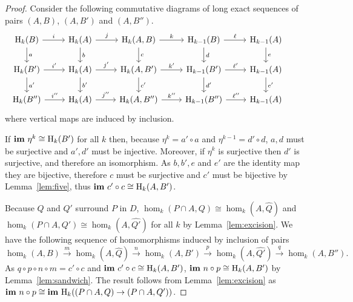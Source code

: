 \begin{proof}
  Consider the following commutative diagrams of long exact sequences of pairs $(A, B)$, $(A, B')$ and $(A, B'')$.
  \begin{equation}\begin{tikzcd}
    \hom_k(B)\arrow{r}{i}\arrow{d}{a} &
    \hom_k(A)\arrow{r}{j}\arrow{d}{b} &
    \hom_k(A, B)\arrow{r}{k}\arrow{d}{c} &
    \hom_{k-1}(B)\arrow{r}{\ell}\arrow{d}{d} &
    \hom_{k-1}(A)\arrow{d}{e} &\\
    \hom_k(B')\arrow{r}{i'}\arrow{d}{a'} &
    \hom_k(A)\arrow{r}{j'}\arrow{d}{b'} &
    \hom_k(A, B')\arrow{r}{k'}\arrow{d}{c'} &
    \hom_{k-1}(B')\arrow{r}{\ell'}\arrow{d}{d'} &
    \hom_{k-1}(A)\arrow{d}{e'} \\
    \hom_k(B'')\arrow{r}{i''}&
    \hom_k(A)\arrow{r}{j''}&
    \hom_k(A, B'')\arrow{r}{k''}&
    \hom_{k-1}(B'')\arrow{r}{\ell''} &
    \hom_{k-1}(A)
  \end{tikzcd}\end{equation}
  where vertical maps are induced by inclusion.

  If $\mathbf{im}~\eta^k\cong\mathrm{H}_k(B')$ for all $k$ then, because $\eta^k = a'\circ a$ and $\eta^{k-1} = d'\circ d$, $a, d$ must be surjective and $a', d'$ must be injective.
  Moreover, if $\eta^k$ is surjective then $d'$ is surjective, and therefore an isomorphism.
  As $b,b',e$ and $e'$ are the identity map they are bijective, therefore $c$ must be surjective and $c'$ must be bijective by Lemma~\ref{lem:five}, thus $\mathbf{im}~c'\circ c\cong \mathrm{H}_k(A, B')$.

  Because $Q$ and $Q'$ surround $P$ in $D$, $\hom_k(P\cap A, Q)\cong \hom_k(A, \hat{Q})$ and $\hom_k(P\cap A, Q')\cong \hom_k(A, \hat{Q'})$ for all $k$ by Lemma~\ref{lem:excision}.
  We have the following sequence of homomorphisms induced by inclusion of pairs
  \[ \hom_k(A, B)\xrightarrow{m}\hom_k(A, \hat{Q})\xrightarrow{n}\hom_k(A, B')\xrightarrow{p}\hom_k(A, \hat{Q'})\xrightarrow{q}\hom_k(A, B'').\]
  As $q\circ p\circ n\circ m = c' \circ c$ and $\mathbf{im}~c'\circ c\cong \mathrm{H}_k(A, B')$, $\mathbf{im}~n\circ p\cong \mathrm{H}_k(A, B')$ by Lemma~\ref{lem:sandwich}.
  The result follows from Lemma~\ref{lem:excision} as $\mathbf{im}~n\circ p\cong \mathbf{im}~\mathrm{H}_k((P\cap A, Q)\to (P\cap A, Q'))$.

\end{proof}

\clearpage

